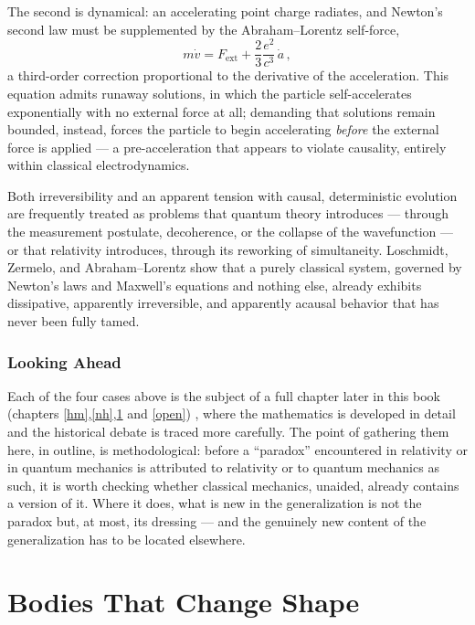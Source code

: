 The second is dynamical: an accelerating point charge radiates, and Newton's
second law must be supplemented by the Abraham--Lorentz self-force,
\begin{equation}
  m\dot v = F_{\text{ext}} + \frac{2}{3}\frac{e^2}{c^3}\,\dot a \, ,
\end{equation}
a third-order correction proportional to the derivative of the acceleration.
This equation admits runaway solutions, in which the particle self-accelerates
exponentially with no external force at all; demanding that solutions remain
bounded, instead, forces the particle to begin accelerating \emph{before} the
external force is applied --- a pre-acceleration that appears to violate
causality, entirely within classical electrodynamics.

Both irreversibility and an apparent tension with causal, deterministic
evolution are frequently treated as problems that quantum theory introduces
--- through the measurement postulate, decoherence, or the collapse of the
wavefunction --- or that relativity introduces, through its reworking of
simultaneity. Loschmidt, Zermelo, and Abraham--Lorentz show that a purely
classical system, governed by Newton's laws and Maxwell's equations and nothing
else, already exhibits dissipative, apparently irreversible, and apparently
acausal behavior that has never been fully tamed.

\subsection{Looking Ahead}

Each of the four cases above is the subject of a full chapter later in this
book (chapters \ref{hm},\ref{nh},\ref{shape} and \ref{open})
, where the mathematics is developed in detail and the historical debate is
traced more carefully. The point of gathering them here, in outline, is
methodological: before a ``paradox'' encountered in relativity or in quantum
mechanics is attributed to relativity or to quantum mechanics as such, it is
worth checking whether classical mechanics, unaided, already contains a version
of it. Where it does, what is new in the generalization is not the paradox but,
at most, its dressing --- and the genuinely new content of the generalization
has to be located elsewhere.

\chapter{Bodies That Change Shape}
\label{shape}

